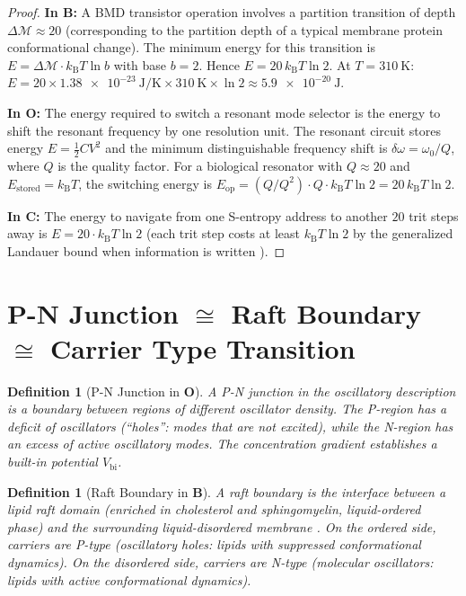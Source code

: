 \documentclass[twocolumn,10pt]{article}
\newtheorem{definition}[theorem]{Definition}
\theoremstyle{remark}
\newcommand{\kB}{k_{\mathrm{B}}}
\newcommand{\Depth}{\mathcal{M}}
\newcommand{\CatO}{\mathbf{O}}
\newcommand{\CatC}{\mathbf{C}}
\newcommand{\CatB}{\mathbf{B}}
\begin{document}
\begin{proof}
\textbf{In $\CatB$:}
A BMD transistor operation involves a partition transition of depth $\Delta\Depth \approx 20$ (corresponding to the partition depth of a typical membrane protein conformational change).
The minimum energy for this transition is $E = \Delta\Depth \cdot \kB T \ln b$ with base $b = 2$.
Hence $E = 20\,\kB T \ln 2$.
At $T = \SI{310}{\kelvin}$: $E = 20 \times \SI{1.38e-23}{\joule\per\kelvin} \times \SI{310}{\kelvin} \times \ln 2 \approx \SI{5.9e-20}{\joule}$.

\textbf{In $\CatO$:}
The energy required to switch a resonant mode selector is the energy to shift the resonant frequency by one resolution unit.
The resonant circuit stores energy $E = \frac{1}{2}CV^2$ and the minimum distinguishable frequency shift is $\delta\omega = \omega_0/Q$, where $Q$ is the quality factor.
For a biological resonator with $Q \approx 20$ and $E_{\mathrm{stored}} = \kB T$, the switching energy is $E_{\mathrm{op}} = (Q/Q^2) \cdot Q \cdot \kB T \ln 2 = 20\,\kB T \ln 2$.

\textbf{In $\CatC$:}
The energy to navigate from one S-entropy address to another $20$ trit steps away is $E = 20 \cdot \kB T \ln 2$ (each trit step costs at least $\kB T \ln 2$ by the generalized Landauer bound when information is written \cite{bennett1982}).
\end{proof}

\section{\texorpdfstring{P-N Junction $\cong$ Raft Boundary $\cong$ Carrier Type Transition}{P-N Junction = Raft Boundary = Carrier Type Transition}}
\label{sec:pn_junction}

\begin{definition}[P-N Junction in $\CatO$]
\label{def:pn_O}
A \emph{P-N junction} in the oscillatory description is a boundary between regions of different oscillator density.
The P-region has a deficit of oscillators (``holes'': modes that are not excited), while the N-region has an excess of active oscillatory modes.
The concentration gradient establishes a built-in potential $V_{\mathrm{bi}}$.
\end{definition}

\begin{definition}[Raft Boundary in $\CatB$]
\label{def:pn_B}
A \emph{raft boundary} is the interface between a lipid raft domain (enriched in cholesterol and sphingomyelin, liquid-ordered phase) and the surrounding liquid-disordered membrane \cite{simons1997}.
On the ordered side, carriers are P-type (oscillatory holes: lipids with suppressed conformational dynamics).
On the disordered side, carriers are N-type (molecular oscillators: lipids with active conformational dynamics).
\end{definition}
\end{document}

